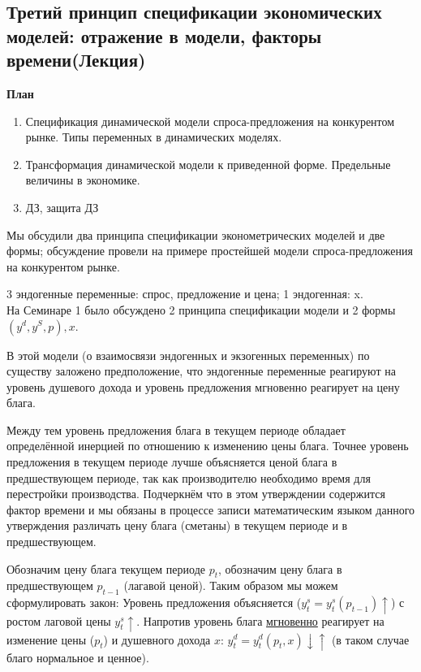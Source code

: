 \documentclass[12pt,a4paper]{article}
\author{Аверьянов Т.С.}
\begin{document}
\begin{center}
\section*{Третий принцип спецификации экономических моделей: отражение в модели, факторы времени(Лекция)}
\end{center}
\begin{center}
\textbf{План}
\end{center}
\begin{enumerate}
\item Спецификация динамической модели спроса-предложения на конкурентом рынке. Типы переменных в динамических моделях.
\item Трансформация динамической модели к приведенной форме. Предельные величины в экономике. 
\item ДЗ, защита ДЗ
\end{enumerate}

Мы обсудили два принципа спецификации эконометрических моделей и две формы; обсуждение провели на примере простейшей модели спроса-предложения на конкурентом рынке.

3 эндогенные переменные: спрос, предложение и цена; 1 эндогенная: x. \\
На Семинаре 1 было обсуждено 2 принципа спецификации модели и 2 формы $(y^d, y^S, p), x$.

В этой модели (о взаимосвязи эндогенных  и экзогенных переменных) по существу заложено предположение, что эндогенные переменные реагируют на уровень душевого дохода и уровень предложения мгновенно реагирует на цену блага.

Между тем уровень предложения блага в текущем периоде обладает определённой инерцией по отношению к изменению цены блага. Точнее уровень предложения в текущем периоде лучше объясняется ценой блага в предшествующем периоде, так как производителю необходимо время для перестройки производства. Подчеркнём что в этом утверждении содержится фактор времени и мы обязаны в процессе записи математическим языком данного утверждения различать цену блага (сметаны) в текущем периоде и в предшествующем.

Обозначим цену блага текущем периоде $p_t$, обозначим цену блага в предшествующем $p_{t-1}$ (лагавой ценой). Таким образом мы можем сформулировать закон: Уровень предложения объясняется ($y_t^s = y_t^s(p_{t-1})\uparrow$) с ростом лаговой цены $y_t^s \uparrow$. Напротив уровень блага \underline{мгновенно} реагирует на изменение цены ($p_t$) и душевного дохода $x$: $y_t^d = y_t^d(p_t, x)\downarrow \uparrow$ (в таком случае благо нормальное и ценное).
\end{document}
